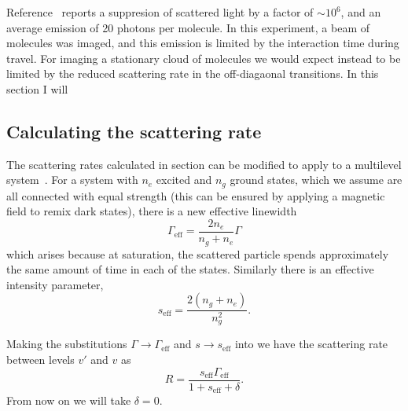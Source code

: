 Reference~\cite{Shaw2021} reports a suppresion of scattered light by a factor
of $\sim10^6$, and an average emission of 20 photons per molecule. In this
experiment, a beam of molecules was imaged, and this emission is limited by the
interaction time during travel. For imaging a stationary cloud of molecules we
would expect instead to be limited by the reduced scattering rate in the
off-diagaonal transitions. In this section I will 

\subsection{Calculating the scattering rate}

The scattering rates calculated in section  can be modified to
apply to a multilevel system~\cite{Metcalf1999}. For a system with $n_e$
excited and $n_g$ ground states, which we assume are all connected with equal
strength (this can be ensured by applying a magnetic field to remix dark
states), there is a new effective linewidth~\cite{}
%
\begin{equation}
  \Gamma_\text{eff} = \frac{2n_e}{n_g + n_e}\Gamma
\end{equation}
%
which arises because at saturation, the scattered particle spends approximately
the same amount of time in each of the states. Similarly there is an effective
intensity parameter,
%
\begin{equation}
  s_\text{eff} = \frac{2(n_g + n_e)}{n_g^2}.
\end{equation}
%

Making the substitutions $\Gamma\rightarrow\Gamma_\text{eff}$ and $s\rightarrow
s_\text{eff}$ into  we have the scattering rate between
levels $v'$ and $v$ as
%
\begin{equation}
  R = \frac{s_\text{eff}\Gamma_\text{eff}}{1 + s_\text{eff} + \delta}.
\end{equation}
%
From now on we will take $\delta = 0$.

